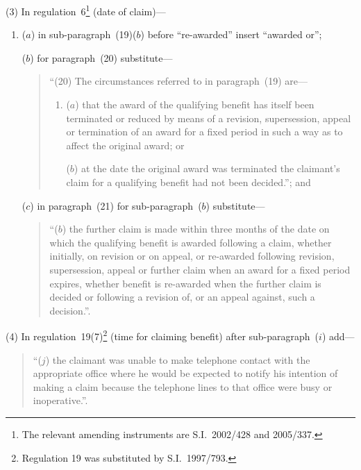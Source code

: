 \documentclass[12pt,a4paper]{article}
\begin{document}
(3) In regulation~6\footnote{The relevant amending instruments are S.I.~2002/428 and 2005/337.} (date of claim)—
\begin{enumerate}\item[]
($a$) in sub-paragraph~(19)($b$)  before “re-awarded” insert “awarded or”;

($b$) for paragraph~(20) substitute—
\begin{quotation}
“(20) The circumstances referred to in paragraph~(19) are—
\begin{enumerate}\item[]
($a$) that the award of the qualifying benefit has itself been terminated or reduced by means of a revision, supersession, appeal or termination of an award for a fixed period in such a way as to affect the original award; or

($b$) at the date the original award was terminated the claimant’s claim for a qualifying benefit had not been decided.”; and
\end{enumerate}
\end{quotation}

($c$) in paragraph~(21) for sub-paragraph~($b$)  substitute—
\begin{quotation}
“($b$) the further claim is made within three months of the date on which the qualifying benefit is awarded following a claim, whether initially, on revision or on appeal, or re-awarded following revision, supersession, appeal or further claim when an award for a fixed period expires, whether benefit is re-awarded when the further claim is decided or following a revision of, or an appeal against, such a decision.”.
\end{quotation}
\end{enumerate}

(4) In regulation~19(7)\footnote{Regulation 19 was substituted by S.I.~1997/793.} (time for claiming benefit) after sub-paragraph~($i$) add—
\begin{quotation}
“($j$) the claimant was unable to make telephone contact with the appropriate office where he would be expected to notify his intention of making a claim because the telephone lines to that office were busy or inoperative.”.
\end{quotation}
\end{document}
